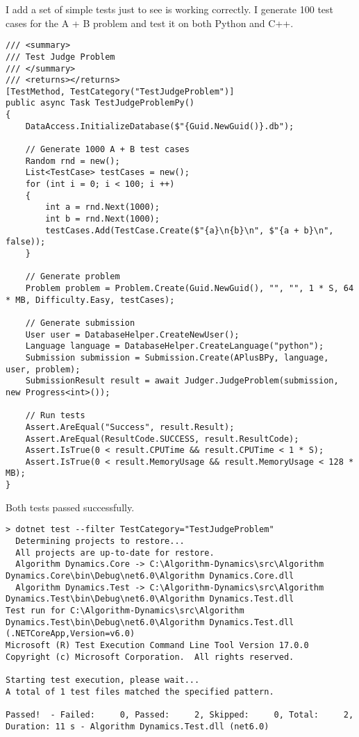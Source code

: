 \documentclass[report.tex]{subfiles}
\begin{document}
I add a set of simple tests just to see  is working correctly. I generate 100 test cases for the A + B problem and test it on both Python and C++.

\begin{verbatim}
/// <summary>
/// Test Judge Problem
/// </summary>
/// <returns></returns>
[TestMethod, TestCategory("TestJudgeProblem")]
public async Task TestJudgeProblemPy()
{
    DataAccess.InitializeDatabase($"{Guid.NewGuid()}.db");

    // Generate 1000 A + B test cases
    Random rnd = new();
    List<TestCase> testCases = new();
    for (int i = 0; i < 100; i ++)
    {
        int a = rnd.Next(1000);
        int b = rnd.Next(1000);
        testCases.Add(TestCase.Create($"{a}\n{b}\n", $"{a + b}\n", false));
    }
    
    // Generate problem
    Problem problem = Problem.Create(Guid.NewGuid(), "", "", 1 * S, 64 * MB, Difficulty.Easy, testCases);

    // Generate submission
    User user = DatabaseHelper.CreateNewUser();
    Language language = DatabaseHelper.CreateLanguage("python");
    Submission submission = Submission.Create(APlusBPy, language, user, problem);
    SubmissionResult result = await Judger.JudgeProblem(submission, new Progress<int>());

    // Run tests
    Assert.AreEqual("Success", result.Result);
    Assert.AreEqual(ResultCode.SUCCESS, result.ResultCode);
    Assert.IsTrue(0 < result.CPUTime && result.CPUTime < 1 * S);
    Assert.IsTrue(0 < result.MemoryUsage && result.MemoryUsage < 128 * MB);
}
\end{verbatim}

Both tests passed successfully.

\begin{verbatim}
> dotnet test --filter TestCategory="TestJudgeProblem"
  Determining projects to restore...
  All projects are up-to-date for restore.
  Algorithm Dynamics.Core -> C:\Algorithm-Dynamics\src\Algorithm Dynamics.Core\bin\Debug\net6.0\Algorithm Dynamics.Core.dll
  Algorithm Dynamics.Test -> C:\Algorithm-Dynamics\src\Algorithm Dynamics.Test\bin\Debug\net6.0\Algorithm Dynamics.Test.dll
Test run for C:\Algorithm-Dynamics\src\Algorithm Dynamics.Test\bin\Debug\net6.0\Algorithm Dynamics.Test.dll (.NETCoreApp,Version=v6.0)
Microsoft (R) Test Execution Command Line Tool Version 17.0.0
Copyright (c) Microsoft Corporation.  All rights reserved.

Starting test execution, please wait...
A total of 1 test files matched the specified pattern.

Passed!  - Failed:     0, Passed:     2, Skipped:     0, Total:     2, Duration: 11 s - Algorithm Dynamics.Test.dll (net6.0)
\end{verbatim}
\end{document}
